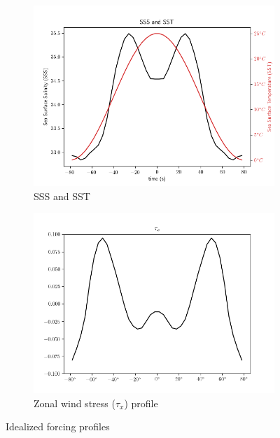 \documentclass[a4paper]{article}
\begin{document}
\begin{figure}[H]
\begin{subfigure}{.5\textwidth}
	\includegraphics[width=0.9\linewidth]{sss_sst_profile.png}
	\caption{SSS and SST}
	\label{fig:sst_sss}
\end{subfigure}
\begin{subfigure}{.5\textwidth}
	\centering
	\includegraphics[width=0.9\linewidth]{tau_x_profile.png}
	\caption{Zonal wind stress ($\tau_x$) profile}
	\label{fig:tau_X}
\end{subfigure}

\caption{Idealized forcing profiles}

\end{figure}
\end{document}
